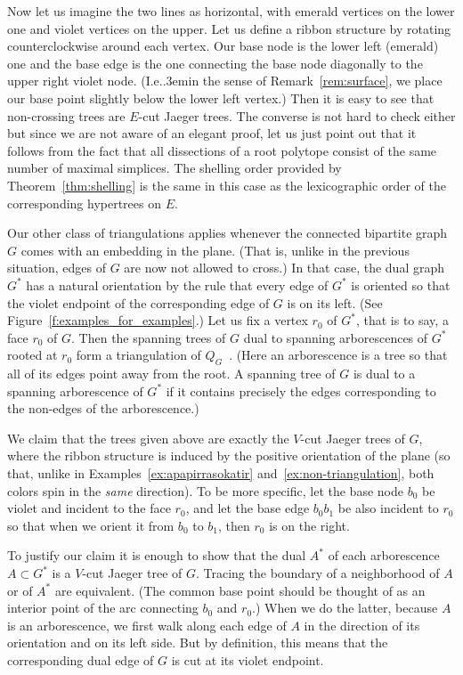 \documentclass[ALCO,ThmDefs,Unicode,epreuves]{cedram}
\newcommand\Ie{I.e.\kern.3em}
\begin{document}
Now let us imagine the two lines as horizontal, with emerald vertices on the lower one and violet vertices on the upper. Let us define a ribbon structure by rotating counterclockwise around each vertex. Our base node is the lower left (emerald) one and the base edge is the one connecting the base node diagonally to the upper right violet node. (\Ie in the sense of Remark~\ref{rem:surface}, we place our base point slightly below the lower left vertex.) Then it is easy to see that non-crossing trees are $E$-cut Jaeger trees. The converse is not hard to check either but since we are not aware of an elegant proof, let us just point out that it follows from the fact that all dissections of a root polytope consist of the same number of maximal simplices. The shelling order provided by Theorem~\ref{thm:shelling} is the same in this case as the lexicographic order of the corresponding hypertrees on $E$.

Our other class of triangulations applies whenever the connected bipartite graph $G$ comes with an embedding in the plane. (That is, unlike in the previous situation, edges of $G$ are now not allowed to cross.) In that case, the dual graph $G^*$ has a natural orientation by the rule that every edge of $G^*$ is oriented so that the violet endpoint of the corresponding edge of $G$ is on its left. (See Figure~\ref{f:examples_for_examples}.) Let us fix a vertex $r_0$ of $G^*$, that is to say, a face $r_0$ of $G$. Then the spanning trees of $G$ dual to spanning arborescences of $G^*$ rooted at $r_0$ form a triangulation of $Q_G$~\cite{KM}. (Here an arborescence is a tree so that all of its edges point away from the root. A spanning tree of $G$ is dual to a spanning arborescence of $G^*$ if it contains precisely the edges corresponding to the non-edges of the arborescence.)

We claim that the trees given above are exactly the $V$-cut Jaeger trees of $G$, where the ribbon structure is induced by the positive orientation of the plane (so that, unlike in Examples~\ref{ex:apapirrasokatir} and~\ref{ex:non-triangulation}, both colors spin in the \emph{same} direction). To be more specific, let the base node $b_0$ be violet and incident to the face $r_0$, and let the base edge $b_0b_1$ be also incident to $r_0$ so that when we orient it from $b_0$ to $b_1$, then $r_0$ is on the right. 

To justify our claim it is enough to show that the dual $A^*$ of each arborescence $A\subset G^*$ is a $V$-cut Jaeger tree of $G$. Tracing the boundary of a neighborhood of $A$ or of $A^*$ are equivalent. (The common base point should be thought of as an interior point of the arc connecting $b_0$ and $r_0$.) When we do the latter, because $A$ is an arborescence, we first walk along each edge of $A$ in the direction of its orientation and on its left side. But by definition, this means that the corresponding dual edge of $G$ is cut at its violet endpoint.
\end{document}
